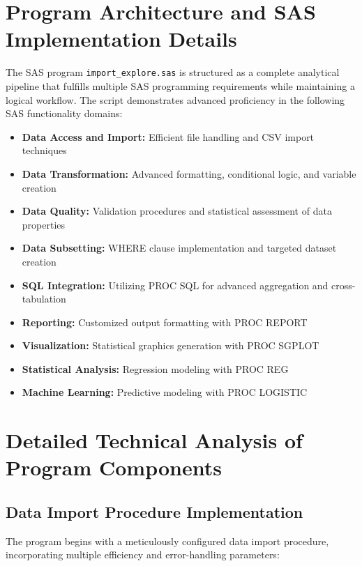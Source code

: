 \documentclass{article}
\begin{document}
\section{Program Architecture and SAS Implementation Details}
The SAS program \texttt{import\_explore.sas} is structured as a complete analytical pipeline that fulfills multiple SAS programming requirements while maintaining a logical workflow. The script demonstrates advanced proficiency in the following SAS functionality domains:

\begin{itemize}[leftmargin=*]
    \item \textbf{Data Access and Import:} Efficient file handling and CSV import techniques
    \item \textbf{Data Transformation:} Advanced formatting, conditional logic, and variable creation
    \item \textbf{Data Quality:} Validation procedures and statistical assessment of data properties
    \item \textbf{Data Subsetting:} WHERE clause implementation and targeted dataset creation
    \item \textbf{SQL Integration:} Utilizing PROC SQL for advanced aggregation and cross-tabulation
    \item \textbf{Reporting:} Customized output formatting with PROC REPORT
    \item \textbf{Visualization:} Statistical graphics generation with PROC SGPLOT
    \item \textbf{Statistical Analysis:} Regression modeling with PROC REG
    \item \textbf{Machine Learning:} Predictive modeling with PROC LOGISTIC
\end{itemize}

\section{Detailed Technical Analysis of Program Components}

\subsection{Data Import Procedure Implementation}
The program begins with a meticulously configured data import procedure, incorporating multiple efficiency and error-handling parameters:
\end{document}
